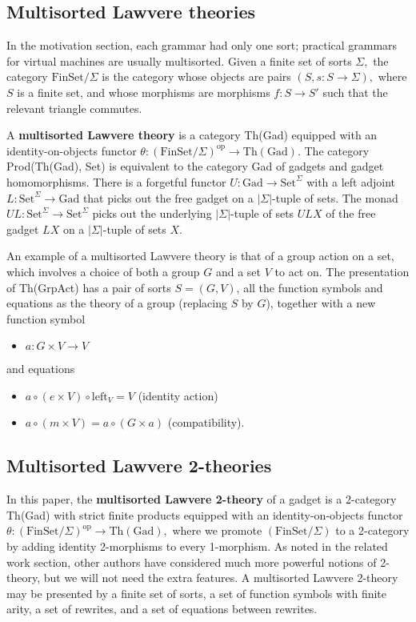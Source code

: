 \documentclass{article}
\newcommand{\maps}{\colon}
\newcommand{\FinSet}{\mathrm{FinSet}}
\newcommand{\Set}{\mathrm{Set}}
\newcommand{\Gad}{\mathrm{Gad}}
\newcommand{\op}{\mathrm{op}}
\begin{document}
\subsection{Multisorted Lawvere theories}
In the motivation section, each grammar had only one sort; practical grammars for virtual machines are usually multisorted.  Given a finite set of sorts $\Sigma,$ the category $\FinSet/\Sigma$ is the category whose objects are pairs $(S, s\maps S\to \Sigma),$ where $S$ is a finite set, and whose morphisms are morphisms $f\maps S \to S'$ such that the relevant triangle commutes.

A {\bf multisorted Lawvere theory} is a category Th(Gad) equipped with an identity-on-objects functor ${\theta\maps (\FinSet/\Sigma)^\op \to \mathrm{Th(Gad)}.}$  The category Prod(\allowbreak Th(Gad), Set) is equivalent to the category Gad of gadgets and gadget homomorphisms.  There is a forgetful functor ${U\maps \Gad \to \Set^\Sigma}$ with a left adjoint ${L\maps \Set^\Sigma \to \Gad}$ that picks out the free gadget on a $|\Sigma|$-tuple of sets.  The monad ${UL\maps \Set^\Sigma \to \Set^\Sigma}$ picks out the underlying $|\Sigma|$-tuple of sets $ULX$ of the free gadget $LX$ on a $|\Sigma|$-tuple of sets $X$.

An example of a multisorted Lawvere theory is that of a group action on a set, which involves a choice of both a group $G$ and a set $V$ to act on.  The presentation of Th(GrpAct) has a pair of sorts $S = (G, V)$, all the function symbols and equations as the theory of a group (replacing $S$ by $G$), together with a new function symbol
\begin{itemize}
  \item $a\maps G \times V \to V$
\end{itemize}
and equations
\begin{itemize}
  \item $a \circ (e \times V) \circ \mathrm{left}_V = V$ (identity action)
  \item $a \circ (m \times V) = a \circ (G \times a)$ (compatibility).
\end{itemize}

\subsection {Multisorted Lawvere 2-theories}
In this paper, the {\bf multisorted Lawvere 2-theory} of a gadget is a 2-category Th(Gad) with strict finite products equipped with an identity-on-objects functor $\theta\maps (\FinSet/\Sigma)^\op \to \mathrm{Th(Gad)},$ where we promote $(\FinSet/\Sigma)$ to a 2-category by adding identity 2-morphisms to every 1-morphism.  As noted in the related work section, other authors have considered much more powerful notions of 2-theory, but we will not need the extra features.  A multisorted Lawvere 2-theory may be presented by a finite set of sorts, a set of function symbols with finite arity, a set of rewrites, and a set of equations between rewrites.  
\end{document}
